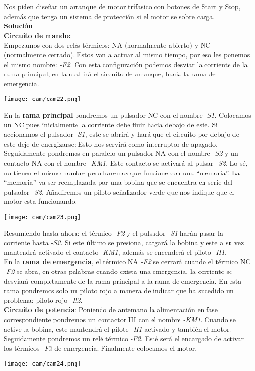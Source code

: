 \documentclass[
	12pt, %
	fleqn, %
	a4paper, %
	oneside, %
]{LegrandOrangeBook}
\begin{document}
\begin{example}
Nos piden diseñar un arranque de motor trífasico con botones de Start y Stop, además que tenga un sistema de protección si el motor se sobre carga.\\
\textbf{Solución}\\
\textbf{Circuito de mando:}\\
Empezamos con dos relés térmicos: NA (normalmente abierto) y NC (normalmente cerrado). Estos van a actuar al mismo tiempo, por eso les ponemos el mismo nombre: \textit{-F2}. Con esta configuración podemos desviar la corriente de la rama principal, en la cual irá el circuito de arranque, hacia la rama de emergencia.
\begin{center}
\texttt{[image: cam/cam22.png]}
\end{center}
En la \textbf{rama principal} pondremos un pulsador NC con el nombre \textit{-S1}. Colocamos un NC pues inicialmente la corriente debe fluir hacia debajo de este. Si accionamos el pulsador \textit{-S1}, este se abrirá y hará que el circuito por debajo de este deje de energizarse: Esto nos servirá como interruptor de apagado. Seguidamente pondremos en paralelo un pulsador NA con el nombre \textit{-S2} y un contacto NA con el nombre \textit{-KM1}. Este contacto se activará al pulsar \textit{-S2}. Lo sé, no tienen el mismo nombre pero haremos que funcione con una ``memoria''. La ``memoria'' va ser reemplazada por una bobina que se encuentra en serie del pulsador \textit{-S2}. Añadiremos un piloto señalizador verde que nos indique que el motor esta funcionando.
\begin{center}
\texttt{[image: cam/cam23.png]}
\end{center}
Resumiendo hasta ahora: el térmico \textit{-F2} y el pulsador \textit{-S1} harán pasar la corriente hasta \textit{-S2}. Si este último se presiona, cargará la bobina y este a su vez mantendrá activado el contacto \textit{-KM1}, además se encenderá el piloto \textit{-H1}.\\
En la \textbf{rama de emergencia}, el térmico NA \textit{-F2} se cerrará cuando el térmico NC \textit{-F2} se abra, en otras palabras cuando exista una emergencia, la corriente se desviará completamente de la rama principal a la rama de emergencia. En esta rama pondremos solo un piloto rojo a manera de indicar que ha sucedido un problema: piloto rojo \textit{-H2}.\\
\textbf{Circuito de potencia}:
Poniendo de antemano la alimentación en fase correspondiente pondremos un contactor III con el nombre \textit{-KM1}. Cuando se active la bobina, este mantendrá el piloto \textit{-H1} activado y también el motor. Seguidamente pondremos un relé térmico \textit{-F2}. Esté será el encargado de activar los térmicos \textit{-F2} de emergencia. Finalmente colocamos el motor.
\begin{center}
\texttt{[image: cam/cam24.png]}
\end{center}
\end{example}
\end{document}
